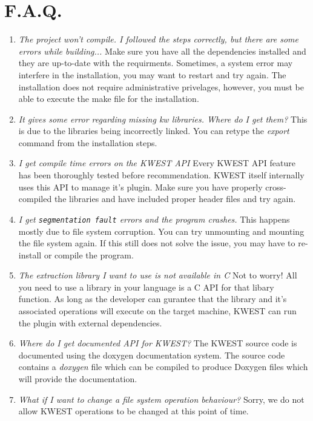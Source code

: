 \section{F.A.Q.}
\begin{enumerate} 
\item \emph{The project won't compile. I followed the steps correctly, but there are some errors while building...} \newline
Make sure you have all the dependencies installed and they are up-to-date with the requirments. Sometimes, a system error may interfere in the installation, you may want to restart and try again. The installation does not require administrative privelages, however, you must be able to execute the make file for the installation.
\item \emph{It gives some error regarding missing kw libraries. Where do I get them?} \newline
This is due to the libraries being incorrectly linked. You can retype the \textit{export} command from the installation steps.
\item \emph{I get compile time errors on the KWEST API} \newline
Every KWEST API feature has been thoroughly tested before recommendation. KWEST itself internally uses this API to manage it's plugin. Make sure you have properly cross-compiled the libraries and have included proper header files and try again.
\item \emph{I get \texttt{segmentation fault} errors and the program crashes.} \newline
This happens mostly due to file system corruption. You can try unmounting and mounting the file system again. If this still does not solve the issue, you may have to re-install or compile the program.
\item \emph{The extraction library I want to use is not available in C} \newline
Not to worry! All you need to use a library in your language is a C API for that libary function. As long as the developer can gurantee that the library and it's associated operations will execute on the target machine, KWEST can run the plugin with external dependencies.
\item \emph{Where do I get documented API for KWEST?} \newline
The KWEST source code is documented using the doxygen documentation system. The source code contains a \textit{doxygen} file which can be compiled to produce Doxygen files which will provide the documentation.
\item \emph{What if I want to change a file system operation behaviour?} \newline
Sorry, we do not allow KWEST operations to be changed at this point of time.
\end{enumerate}